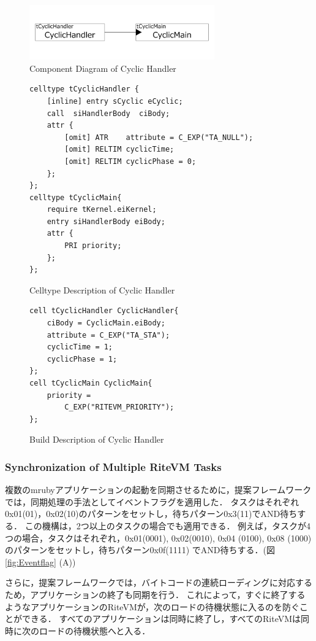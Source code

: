 \documentclass[submit]{ipsj_v2/UTF8/ipsj}
\begin{document}
\begin{figure}[t]
    \centering
    \includegraphics[width=8cm,clip]{../EMSOFT2016/figure/cyclic_handler.pdf}
    \caption{Component Diagram of Cyclic Handler}
    \label{fig:cyclic_handler}
\end{figure}
\begin{figure}[t]
    \centering
    \begin{lstlisting}
celltype tCyclicHandler {
    [inline] entry sCyclic eCyclic;
    call  siHandlerBody  ciBody;
    attr {
    	[omit] ATR    attribute = C_EXP("TA_NULL");
    	[omit] RELTIM cyclicTime;
    	[omit] RELTIM cyclicPhase = 0;
    };
};
celltype tCyclicMain{
    require tKernel.eiKernel;
    entry siHandlerBody eiBody;
    attr {
        PRI priority;
    };
};
    \end{lstlisting}
    \caption{Celltype Description of Cyclic Handler}
    \label{celltype_cyclic_handler}
\end{figure}
\begin{figure}[t]
    \centering
    \begin{lstlisting}
cell tCyclicHandler CyclicHandler{
    ciBody = CyclicMain.eiBody;
    attribute = C_EXP("TA_STA");
    cyclicTime = 1;
    cyclicPhase = 1;
};
cell tCyclicMain CyclicMain{
    priority =
        C_EXP("RITEVM_PRIORITY");
};
   \end{lstlisting}
    \caption{Build Description of Cyclic Handler}
    \label{build_cyclic_handler}
\end{figure}
 
\subsubsection{Synchronization of Multiple RiteVM Tasks}
複数のmrubyアプリケーションの起動を同期させるために，提案フレームワークでは，同期処理の手法としてイベントフラグを適用した．
タスクはそれぞれ0x01(01)，0x02(10)のパターンをセットし，待ちパターン0x3(11)でAND待ちする．
この機構は，2つ以上のタスクの場合でも適用できる．
例えば，タスクが4つの場合，タスクはそれぞれ，0x01(0001), 0x02(0010), 0x04 (0100), 0x08 (1000)のパターンをセットし，待ちパターン0x0f(1111) でAND待ちする．(図\ref{fig:Eventflag} (A))

さらに，提案フレームワークでは，バイトコードの連続ローディングに対応するため，アプリケーションの終了も同期を行う．
これによって，すぐに終了するようなアプリケーションのRiteVMが，次のロードの待機状態に入るのを防ぐことができる．
すべてのアプリケーションは同時に終了し，すべてのRiteVMは同時に次のロードの待機状態へと入る．
\end{document}
